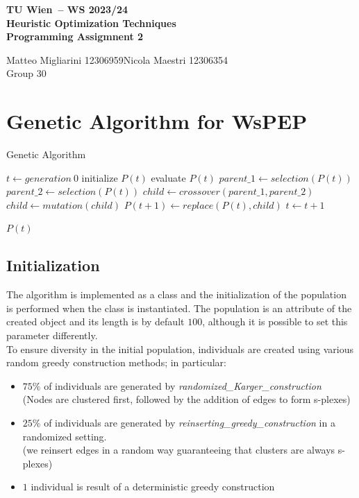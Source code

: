 \documentclass[a4paper,12pt]{article}
\newcommand{\semester}{WS 2023/24}
\newcommand{\authorOne}{Matteo Migliarini 12306959}
\newcommand{\authorTwo}{Nicola Maestri 12306354}
\newcommand{\groupno}{30} %
\begin{document}
\noindent\hrulefill\medskip
\begin{center}
  {\large \bf TU Wien\ -- \semester\\[1mm]
    Heuristic Optimization Techniques\\[1mm]
    Programming Assigmnent 2}\\[0.5mm]
  \bigskip
  
  {\authorOne\linebreak\authorTwo}
  \medskip\\
  {Group \groupno}
\end{center}
\vspace{0.1cm}
\noindent\hrulefill\medskip


\section*{Genetic Algorithm for WsPEP}
\begin{algorithm}
\caption{Genetic Algorithm}
\begin{algorithmic}

\State $t \gets generation\ 0$
\State initialize $P(t)$
\State evaluate $P(t)$
    \State $parent\_1 \gets selection(P(t))$
    \State $parent\_2 \gets selection(P(t))$
    \State $child \gets crossover(parent\_1,parent\_2)$
    \State $child \gets mutation(child)$
    \State $P(t+1) \gets replace(P(t),child)$
    \State $t \gets t+1$
\EndWhile

\noindent
\Return $P(t)$
\end{algorithmic}
\end{algorithm}

\subsection*{Initialization}
The algorithm is implemented as a class and the initialization of the population is performed when the class is instantiated. The population is an attribute of the created object and its length is by default $100$, although it is possible to set this parameter differently.\\
To ensure diversity in the initial population, individuals are created using various random greedy construction methods; in particular:
\begin{itemize}
    \item $75\%$ of individuals are generated by \emph{randomized\_Karger\_construction}\\
    (Nodes are clustered first, followed by the addition of edges to form s-plexes)
    \item $25\%$ of individuals are generated by \emph{reinserting\_greedy\_construction} in a randomized setting.\\
    (we reinsert edges in a random way guaranteeing that clusters are always s-plexes)
    \item $1$ individual is result of a deterministic greedy construction
\end{itemize}
\end{document}
